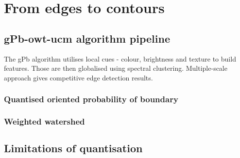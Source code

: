 \chapter{From edges to contours} %
\label{Chapter3}
\section{gPb-owt-ucm algorithm pipeline}
The gPb algorithm utilises local cues - colour, brightness and texture to build features. Those are then globalised using spectral clustering. Multiple-scale approach gives competitive edge detection results.

\subsection{Quantised oriented probability of boundary}
\subsection{Weighted watershed}
\section{Limitations of quantisation} %